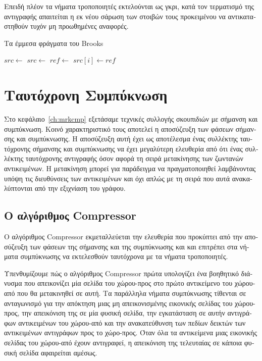 \begin{greek}
Επειδή πλέον τα νήματα τροποποιητές εκτελούνται ως γκρι,
κατά τον τερματισμό της αντιγραφής απαιτείται η εκ νέου
σάρωση των στοιβών τους προκειμένου να αντικαταστηθούν
τυχόν μη προωθημένες αναφορές.

\begin{algorithm}
  \caption{Τα έμμεσα φράγματα του Brooks}
  \label{alg:conc_6}
  \begin{algorithmic}[1]
      \State $src \gets$ 
      \State {}
    \EndFunction
    \Statex
      \State $src \gets$ 
       
        \State $ref \gets$ 
      \EndIf
      \State $src[i] \gets ref$
    \EndProcedure
  \end{algorithmic}  
\end{algorithm}

\section{Ταυτόχρονη Συμπύκνωση}
Στο κεφάλαιο~\ref{ch:mrkcmp} εξετάσαμε τεχνικές συλλογής σκουπιδιών
με σήμανση και συμπύκνωση. Κοινό χαρακτηριστικό τους αποτελεί
η αποσύζευξη των φάσεων σήμανσης και συμπύκνωσης. Η αποσύζευξη αυτή
έχει ως αποτέλεσμα ένας συλλέκτης ταυτόχρονης σήμανσης και συμπύκνωσης
να έχει μεγαλύτερη ελευθερία από ότι ένας συλλέκτης ταυτόχρονης
αντιγραφής όσον αφορά τη σειρά μετακίνησης των ζωντανών αντικειμένων.
Η μετακίνηση μπορεί για παράδειγμα να πραγματοποιηθεί λαμβάνοντας
υπόψη τις διευθύνσεις των αντικειμένων και όχι απλώς με τη σειρά
που αυτά ανακαλύπτονται από την εξιχνίαση του γράφου. 

\subsection{Ο αλγόριθμος Compressor}
Ο αλγόριθμος Compressor εκμεταλλεύεται την ελευθερία που προκύπτει
από την αποσύζευξη των φάσεων της σήμανσης και της συμπύκνωσης και
και επιτρέπει στα νήματα συμπύκνωσης να εκτελεσθούν ταυτόχρονα
με τα νήματα τροποποιητές. 

Υπενθυμίζουμε πώς ο αλγόριθμος Compressor πρώτα υπολογίζει
ένα βοηθητικό διάνυσμα που απεικονίζει μία σελίδα του
χώρου-προς στο πρώτο αντικείμενο του χώρου-από που θα
μετακινηθεί σε αυτή. Τα παράλληλα νήματα συμπύκνωσης τίθενται
σε ανταγωνισμό για την απόκτηση μιας μη απεικονισμένης
εικονικής σελίδας του χώρου-προς, την απεικόνιση της σε
μία φυσική σελίδα, την εγκατάσταση σε αυτήν αντιγράφων
αντικειμένων του χώρου-από και την ανακατεύθυνση των πεδίων
δεικτών των αντικειμένων αντιγράφων προς το χώρο-προς.
Όταν όλα τα αντικείμενα μιας εικονικής σελίδας του χώρου-από
έχουν αντιγραφεί, η απεικόνιση της τελευταίας σε κάποια
φυσική σελίδα αφαιρείται αμέσως.


\end{greek}

